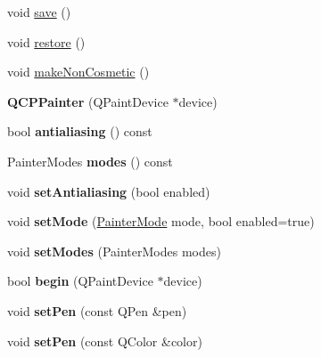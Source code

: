 \begin{DoxyCompactItemize}
\item 
void \hyperlink{class_q_c_p_painter_a8fd6821ee6fecbfa04444c9062912abd}{save} ()
\item 
void \hyperlink{class_q_c_p_painter_a64908e6298d5bbd83457dc987cc3a022}{restore} ()
\item 
void \hyperlink{class_q_c_p_painter_a7e63fbcf47e35c6f2ecd11b8fef7c7d8}{make\+Non\+Cosmetic} ()
\item 
\mbox{\label{class_q_c_p_painter_ae58dbb1795ddc4351ab324dc9898aa22}} 
{\bfseries Q\+C\+P\+Painter} (Q\+Paint\+Device $\ast$device)
\item 
\mbox{\label{class_q_c_p_painter_a5aff96296e995f6f35b2596a482aae37}} 
bool {\bfseries antialiasing} () const
\item 
\mbox{\label{class_q_c_p_painter_aef102658219b24165f7ee2aad1b9e48f}} 
Painter\+Modes {\bfseries modes} () const
\item 
\mbox{\label{class_q_c_p_painter_aaba1deb9188244d9ea65b035112b4d05}} 
void {\bfseries set\+Antialiasing} (bool enabled)
\item 
\mbox{\label{class_q_c_p_painter_af6b1f7d2bbc548b10aa55d8b6ad49577}} 
void {\bfseries set\+Mode} (\hyperlink{class_q_c_p_painter_a156cf16444ff5e0d81a73c615fdb156d}{Painter\+Mode} mode, bool enabled=true)
\item 
\mbox{\label{class_q_c_p_painter_a5fac93adc29c7c4dea9f3e171e9e635e}} 
void {\bfseries set\+Modes} (Painter\+Modes modes)
\item 
\mbox{\label{class_q_c_p_painter_a0a41146ccd619dceab6e25ec7b46b044}} 
bool {\bfseries begin} (Q\+Paint\+Device $\ast$device)
\item 
\mbox{\label{class_q_c_p_painter_af9c7a4cd1791403901f8c5b82a150195}} 
void {\bfseries set\+Pen} (const Q\+Pen \&pen)
\item 
\mbox{\label{class_q_c_p_painter_a5c4d88f21564e156e88ef807f7cf0003}} 
void {\bfseries set\+Pen} (const Q\+Color \&color)
\item 

\end{DoxyCompactItemize}
